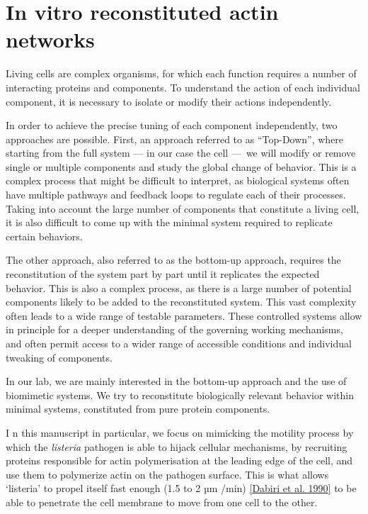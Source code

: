 \documentclass[A4paperpaper,11pt,english]{sphinxmanual}
\begin{document}
\section{In vitro reconstituted actin networks}
\label{index-latex:in-vitro-reconstituted-actin-networks}
Living cells are complex organisms, for which each function requires a number
of interacting proteins and components. To understand the action of each
individual component, it is necessary to isolate or modify their actions
independently.

In order to achieve the precise tuning of each component independently, two
approaches are possible. First, an approach referred to  as ``Top-Down'', where
starting from the full system — in our case the cell — we will modify or remove
single or multiple components and study the global change of behavior. This is a complex
process that might be difficult to interpret, as biological systems often have
multiple pathways and feedback loops to regulate each of their processes. Taking into account the
large number of components that constitute a living cell, it is also
difficult to come up with the minimal system required to replicate certain behaviors.

The other approach, also referred to as the bottom-up approach, requires
the reconstitution of the system part by part until it replicates the expected
behavior. This is also a complex process, as there is a large number of potential components
likely to be added to the reconstituted system. This vast complexity
often leads to a wide range of testable parameters.
These controlled systems allow in principle for a deeper understanding of the governing
working mechanisms, and often permit access to a wider range of accessible
conditions and individual tweaking of components.

In our lab, we are mainly interested in the bottom-up approach and the use of
biomimetic systems. We try to reconstitute biologically relevant behavior within
minimal systems,  constituted from pure protein components.

I       n this manuscript in particular, we focus on mimicking the motility process
by which the \emph{listeria} pathogen is able to hijack cellular mechanisms, by recruiting proteins
responsible for actin polymerisation at the leading edge of the cell, and use
them to polymerize actin on the pathogen surface. This is what allows `listeria' to
propel itself fast enough (1.5 to 2 µm /min) {\hyperref[index-latex:dabiri1990]{{[}Dabiri et al. 1990{]}}} to be able to
penetrate the cell membrane to move from one cell to the other.
\end{document}
